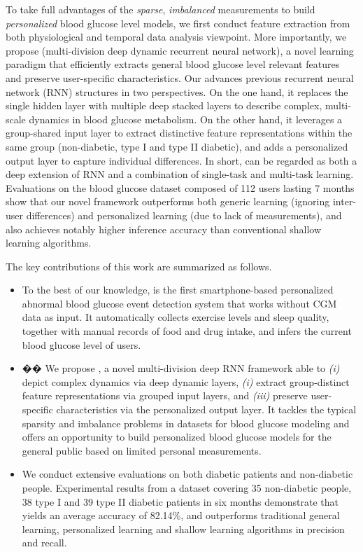 To take full advantages of the \emph{sparse}, \emph{imbalanced} measurements to build \emph{personalized} blood glucose level models, we first conduct feature extraction from both physiological and temporal data analysis viewpoint. More importantly, we propose \modelname (multi-division deep dynamic recurrent neural network), a novel learning paradigm that efficiently extracts general blood glucose level relevant features and preserve user-specific characteristics.
Our \modelname advances previous recurrent neural network (RNN) structures in two perspectives.
On the one hand, it replaces the single hidden layer with multiple deep stacked layers to describe complex, multi-scale dynamics in blood glucose metabolism.
On the other hand, it leverages a group-shared input layer to extract distinctive feature representations within the same group (\ie non-diabetic, type I and type II diabetic), and adds a personalized output layer to capture individual differences.
In short, \modelname can be regarded as both a deep extension of RNN and a combination of single-task and multi-task learning.
Evaluations on the blood glucose dataset composed of 112 users lasting 7 months show that our novel \modelname framework outperforms both generic learning (\ie ignoring inter-user differences) and personalized learning (due to lack of measurements), and also achieves notably higher inference accuracy than conventional shallow learning algorithms.

The key contributions of this work are summarized as follows.
\begin{itemize}
  \item
  To the best of our knowledge, \sysname is the first smartphone-based personalized abnormal blood glucose event detection system that works without CGM data as input.
  It automatically collects exercise levels and sleep quality, together with manual records of food and drug intake, and infers the current blood glucose level of users.
  \item��
  We propose \modelname, a novel multi-division deep RNN framework able to \emph{(i)} depict complex dynamics via deep dynamic layers, \emph{(i)} extract group-distinct feature representations via grouped input layers, and \emph{(iii)} preserve user-specific characteristics via the personalized output layer.
  It tackles the typical sparsity and imbalance problems in datasets for blood glucose modeling and offers an opportunity to build personalized blood glucose models for the general public based on limited personal measurements.
  \item
  We conduct extensive evaluations on both diabetic patients and non-diabetic people.
  Experimental results from a dataset covering 35 non-diabetic people, 38 type I and 39 type II diabetic patients in six months demonstrate that \sysname yields an average accuracy of 82.14\%, and outperforms traditional general learning, personalized learning and shallow learning algorithms in precision and recall.
\end{itemize}

